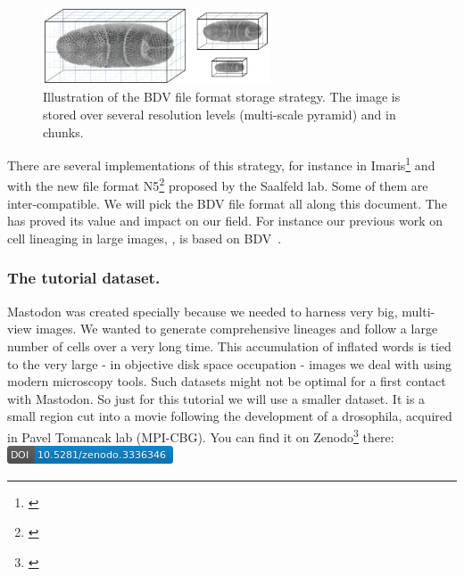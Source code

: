 \begin{figure}
    \centering
    \includegraphics[width=0.6\textwidth]{figures/BdvTikz-pyramidblocks.png}
    \caption{Illustration of the BDV file format storage strategy. The image is stored over several resolution levels (multi-scale pyramid) and in chunks.}
    \label{fig:BDVchunks}
\end{figure}

There are several implementations of this strategy, for instance in Imaris\footnote{\href{http://open.bitplane.com/Default.aspx?tabid=268}{}} and with the new file format N5\footnote{\href{https://github.com/saalfeldlab/n5}{}} proposed by the Saalfeld lab.
Some of them are inter-compatible.
We will pick the BDV file format all along this document. 
The \Bdv has proved its value and impact on our field.
For instance our previous work on cell lineaging in large images, , is based on BDV~\cite{MaMuT}.



\subsubsection{The tutorial dataset.}

Mastodon was created specially because we needed to harness very big, multi-view images. We wanted to generate  comprehensive lineages and follow a large number of cells over a very long time.
This accumulation of inflated words is tied to the very large  - in objective disk space  occupation - images we deal with using modern microscopy tools. 
Such datasets might not be optimal for a first contact with Mastodon.
So just for this tutorial we will use a smaller dataset.
It is a small region cut into a movie following the development of a drosophila, acquired in Pavel Tomancak lab (MPI-CBG).
You can find it on Zenodo\footnote{\href{https://zenodo.org/record/3336346}{}} there: \href{https://doi.org/10.5281/zenodo.3336346}{\includegraphics[height=1.5\fontcharht\font`\B]{figures/zenodo3336346.png}}

